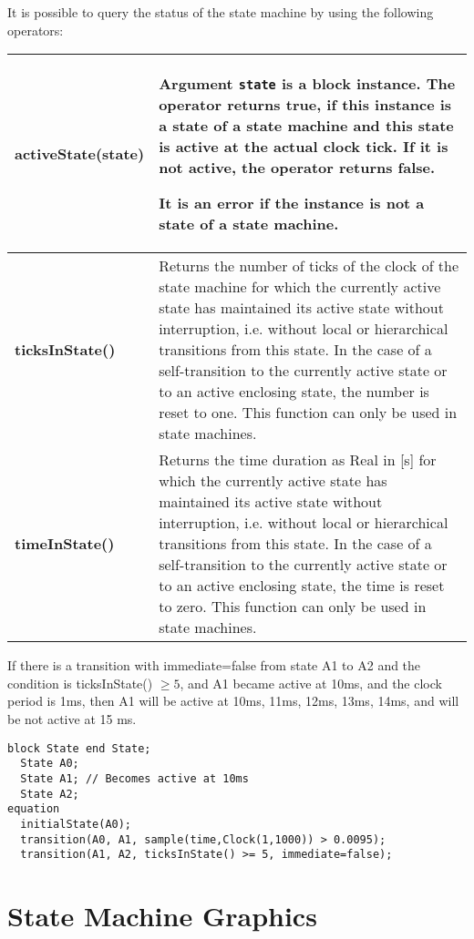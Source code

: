It is possible to query the status of the state machine by using the
following operators:

\begin{longtable}[]{|p{4cm}|p{10cm}|}
\hline \endhead
\textbf{activeState}(state)&
Argument \lstinline!state! is a block instance. The operator returns
\textbf{true}, if this instance is a state of a state machine and this
state is active at the actual clock tick. If it is not active, the
operator returns \textbf{false}.

It is an error if the instance is not a state of a state machine.\\ \hline
\textbf{ticksInState()} & Returns the number of ticks of the clock of the state machine
for which the currently active state has maintained its active state without interruption,
i.e. without local or hierarchical transitions from this state.
In the case of a self-transition to the currently active state or to an active enclosing state,
the number is reset to one.
This function can only be used in state machines.\\ \hline
\textbf{timeInState()} & Returns the time duration as Real in {[}s{]}
for which the currently active state has maintained its active state without interruption,
i.e. without local or hierarchical transitions from this state.
In the case of a self-transition to the currently active state or to an active enclosing state,
the time is reset to zero.
This function can only be used in state machines.\\ \hline

\end{longtable}
\begin{example}
If there is a transition with immediate=false from
state A1 to A2 and the condition is ticksInState() $\ge 5$, and A1 became
active at 10ms, and the clock period is 1ms, then A1 will be active at
10ms, 11ms, 12ms, 13ms, 14ms, and will be not active at 15 ms.
\begin{lstlisting}[language=modelica]
  block State end State;
  State A0;
  State A1; // Becomes active at 10ms
  State A2;
equation
  initialState(A0);
  transition(A0, A1, sample(time,Clock(1,1000)) > 0.0095);
  transition(A1, A2, ticksInState() >= 5, immediate=false);
\end{lstlisting}
\end{example}
\section{State Machine Graphics}

